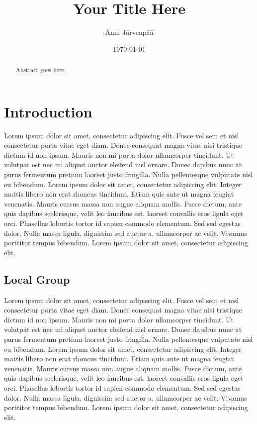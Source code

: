 \documentclass[english, oneside]{HYgradu}
\title{Your Title Here}
\author{Anni Järvenpää}
\date{\today}
\begin{document}
\maketitle

\begin{abstract}
Abstract goes here.
\end{abstract}

\mytableofcontents



\chapter{Introduction}

Lorem ipsum dolor sit amet, consectetur adipiscing elit. Fusce vel sem et nisl consectetur porta vitae eget diam. Donec consequat magna vitae nisi tristique dictum id non ipsum. Mauris non mi porta dolor ullamcorper tincidunt. Ut volutpat est nec mi aliquet auctor eleifend nisl ornare. Donec dapibus nunc at purus fermentum pretium laoreet justo fringilla. Nulla pellentesque vulputate nisl eu bibendum. Lorem ipsum dolor sit amet, consectetur adipiscing elit. Integer mattis libero non erat rhoncus tincidunt. Etiam quis ante ut magna feugiat venenatis. Mauris cursus massa non augue aliquam mollis. Fusce dictum, ante quis dapibus scelerisque, velit leo faucibus est, laoreet convallis eros ligula eget orci. Phasellus lobortis tortor id sapien commodo elementum. Sed sed egestas dolor. Nulla massa ligula, dignissim sed auctor a, ullamcorper ac velit. Vivamus porttitor tempus bibendum. Lorem ipsum dolor sit amet, consectetur adipiscing elit.
\section{Local Group}
Lorem ipsum dolor sit amet, consectetur adipiscing elit. Fusce vel sem et nisl consectetur porta vitae eget diam. Donec consequat magna vitae nisi tristique dictum id non ipsum. Mauris non mi porta dolor ullamcorper tincidunt. Ut volutpat est nec mi aliquet auctor eleifend nisl ornare. Donec dapibus nunc at purus fermentum pretium laoreet justo fringilla. Nulla pellentesque vulputate nisl eu bibendum. Lorem ipsum dolor sit amet, consectetur adipiscing elit. Integer mattis libero non erat rhoncus tincidunt. Etiam quis ante ut magna feugiat venenatis. Mauris cursus massa non augue aliquam mollis. Fusce dictum, ante quis dapibus scelerisque, velit leo faucibus est, laoreet convallis eros ligula eget orci. Phasellus lobortis tortor id sapien commodo elementum. Sed sed egestas dolor. Nulla massa ligula, dignissim sed auctor a, ullamcorper ac velit. Vivamus porttitor tempus bibendum. Lorem ipsum dolor sit amet, consectetur adipiscing elit.
\end{document}
